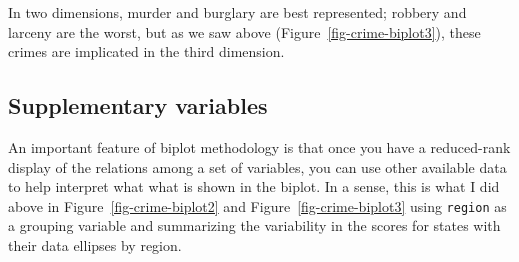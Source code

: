 \documentclass[
  letterpaper,
  10pt,
  krantz2]{krantz}
\makeatletter
\newenvironment{Shaded}{\begin{snugshade}}{\end{snugshade}}
\newcommand{\AttributeTok}[1]{\textcolor[rgb]{0.40,0.45,0.13}{#1}}
\newcommand{\CommentTok}[1]{\textcolor[rgb]{0.37,0.37,0.37}{#1}}
\newcommand{\DecValTok}[1]{\textcolor[rgb]{0.68,0.00,0.00}{#1}}
\newcommand{\FunctionTok}[1]{\textcolor[rgb]{0.28,0.35,0.67}{#1}}
\newcommand{\NormalTok}[1]{\textcolor[rgb]{0.00,0.23,0.31}{#1}}
\newcommand{\OtherTok}[1]{\textcolor[rgb]{0.00,0.23,0.31}{#1}}
\newcommand{\SpecialCharTok}[1]{\textcolor[rgb]{0.37,0.37,0.37}{#1}}
\newenvironment{kframe}{%
  \medskip{}
  \setlength{\fboxsep}{.8em}
  \def\at@end@of@kframe{}%
  \ifinner\ifhmode%
  \def\at@end@of@kframe{\end{minipage}}%
  \begin{minipage}{\columnwidth}%
  \fi\fi%
  \def\FrameCommand##1{\hskip\@totalleftmargin \hskip-\fboxsep
  \colorbox{shadecolor}{##1}\hskip-\fboxsep
      \hskip-\linewidth \hskip-\@totalleftmargin \hskip\columnwidth}%
  \MakeFramed {\advance\hsize-\width
    \@totalleftmargin\z@ \linewidth\hsize
    \@setminipage}}%
{\par\unskip\endMakeFramed%
  \at@end@of@kframe}
\renewenvironment{Shaded}{\begin{kframe}}{\end{kframe}}
\makeatother
\begin{document}
\begin{Shaded}
\end{Shaded}

In two dimensions, murder and burglary are best represented; robbery and
larceny are the worst, but as we saw above
(Figure~\ref{fig-crime-biplot3}), these crimes are implicated in the
third dimension.

\subsection{Supplementary variables}\label{sec-supp-vars}

An important feature of biplot methodology is that once you have a
reduced-rank display of the relations among a set of variables, you can
use other available data to help interpret what what is shown in the
biplot. In a sense, this is what I did above in
Figure~\ref{fig-crime-biplot2} and Figure~\ref{fig-crime-biplot3} using
\texttt{region} as a grouping variable and summarizing the variability
in the scores for states with their data ellipses by region.
\end{document}
